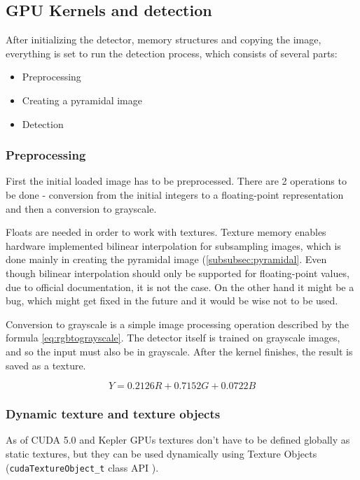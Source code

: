 \subsection{GPU Kernels and detection}

After initializing the detector, memory structures and copying the image, everything is set to run the detection process, which consists of several parts:

\begin{itemize}
	\item Preprocessing
	\item Creating a pyramidal image
	\item Detection
\end{itemize}

\subsubsection{Preprocessing} \label{subsubsec:grayscale} 

First the initial loaded image has to be preprocessed. There are 2 operations to be done - conversion from the initial integers to a floating-point representation and then a conversion to grayscale.

Floats are needed in order to work with textures. Texture memory enables hardware implemented bilinear interpolation for subsampling images, which is done mainly in creating the pyramidal image (\ref{subsubsec:pyramidal}. Even though bilinear interpolation should only be supported for floating-point values, due to official documentation, it is not the case. On the other hand it might be a bug, which might get fixed in the future and it would be wise not to be used.

Conversion to grayscale is a simple image processing operation described by the formula \eqref{eq:rgbtograyscale}. The detector itself is trained on grayscale images, and so the input must also be in grayscale. After the kernel finishes, the result is saved as a texture.

\begin{equation} \label{eq:rgbtograyscale}
Y=0.2126R + 0.7152G + 0.0722B
\end{equation}

\subsubsection{Dynamic texture and texture objects}

As of CUDA 5.0 and Kepler GPUs textures don't have to be defined globally as static textures, but they can be used dynamically using Texture Objects (\verb|cudaTextureObject_t| class API \cite{cuda-texture-obj}).

